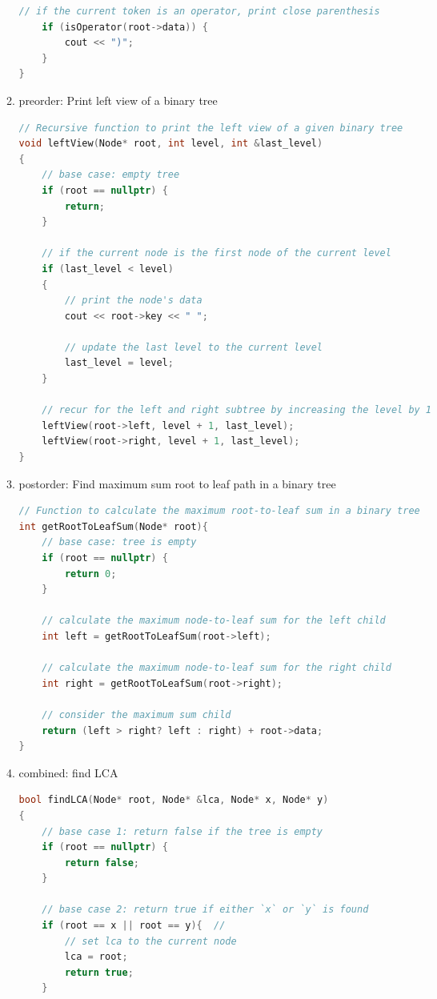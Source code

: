 \documentclass[a4paper,11pt,twoside]{book}
\begin{document}
\begin{itemize}
\begin{enumerate}
\begin{lstlisting}[frame=single, language=c++]
	// if the current token is an operator, print close parenthesis
	if (isOperator(root->data)) {
		cout << ")";
	}
}
\end{lstlisting}

\item preorder:
Print left view of a binary tree
\begin{lstlisting}[frame=single, language=c++]
// Recursive function to print the left view of a given binary tree
void leftView(Node* root, int level, int &last_level)
{
	// base case: empty tree
	if (root == nullptr) {
		return;
	}
	
	// if the current node is the first node of the current level
	if (last_level < level)
	{
		// print the node's data
		cout << root->key << " ";
		
		// update the last level to the current level
		last_level = level;
	}
	
	// recur for the left and right subtree by increasing the level by 1
	leftView(root->left, level + 1, last_level);
	leftView(root->right, level + 1, last_level);
}
\end{lstlisting}

\item postorder: 
Find maximum sum root to leaf path in a binary tree
\begin{lstlisting}[frame=single, language=c++]
// Function to calculate the maximum root-to-leaf sum in a binary tree
int getRootToLeafSum(Node* root){
	// base case: tree is empty
	if (root == nullptr) {
		return 0;
	}
	
	// calculate the maximum node-to-leaf sum for the left child
	int left = getRootToLeafSum(root->left);
	
	// calculate the maximum node-to-leaf sum for the right child
	int right = getRootToLeafSum(root->right);
	
	// consider the maximum sum child
	return (left > right? left : right) + root->data;
}	
\end{lstlisting}

\item combined:
find LCA
\begin{lstlisting}[frame=single, language=c++]
bool findLCA(Node* root, Node* &lca, Node* x, Node* y)
{
	// base case 1: return false if the tree is empty
	if (root == nullptr) {
		return false;
	}
	
	// base case 2: return true if either `x` or `y` is found
	if (root == x || root == y){  // 
		// set lca to the current node
		lca = root;
		return true;
	}
	

\end{lstlisting}
\end{enumerate}
\end{itemize}
\end{document}
